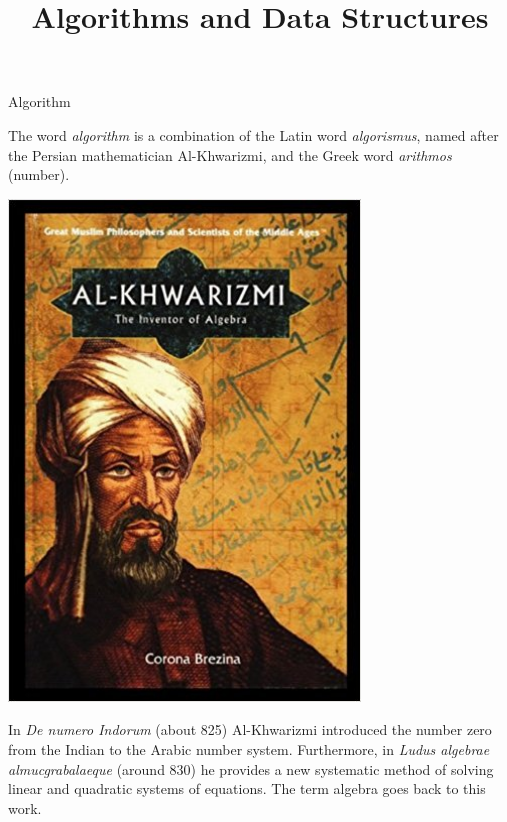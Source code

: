 \documentclass[11pt,compress,t,notes=noshow, xcolor=table]{beamer}
\title{Algorithms and Data Structures}
\begin{document}


\begin{vbframe}{Algorithm}

The word \emph{algorithm} is a combination of the Latin word \emph{algorismus}, named after the Persian mathematician Al-Khwarizmi, and the Greek word \emph{arithmos} (number).

\lz

\begin{minipage}{0.4\textwidth}
  \begin{center}
\includegraphics[width=0.7\textwidth]{figure_man/alkhwarizmi.jpg}
  \end{center}
\end{minipage}
\begin{minipage}{0.5\textwidth}
  \begin{footnotesize}
  In \emph{De numero Indorum} (about 825) Al-Khwarizmi introduced the number zero from the Indian to the Arabic number system. Furthermore, in \emph{Ludus algebrae almucgrabalaeque} (around 830) he provides a new systematic method of solving linear and quadratic systems of equations. The term algebra goes back to this work.
  \end{footnotesize}
\end{minipage}




\end{vbframe}
\end{document}
